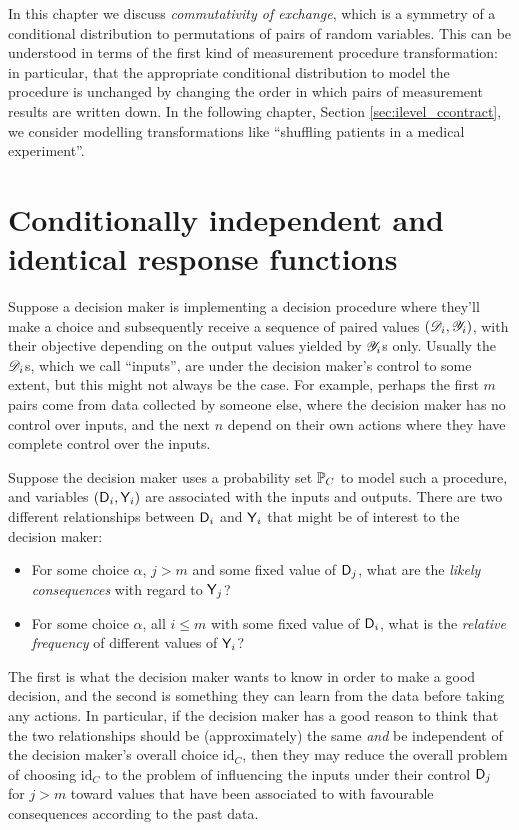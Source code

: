 In this chapter we discuss \emph{commutativity of exchange}, which is a symmetry of a conditional distribution to permutations of pairs of random variables. This can be understood in terms of the first kind of measurement procedure transformation: in particular, that the appropriate conditional distribution to model the procedure is unchanged by changing the order in which pairs of measurement results are written down. In the following chapter, Section \ref{sec:ilevel_ccontract}, we consider modelling transformations like ``shuffling patients in a medical experiment''.

\section[Response functions]{Conditionally independent and identical response functions}\label{sec:response_functions}

Suppose a decision maker is implementing a decision procedure where they'll make a choice and subsequently receive a sequence of paired values $(\mathscr{D}_i,\mathscr{Y}_i)$, with their objective depending on the output values yielded by $\mathscr{Y}_i$s only. Usually the $\mathscr{D}_i$s, which we call ``inputs'', are under the decision maker's control to some extent, but this might not always be the case. For example, perhaps the first $m$ pairs come from data collected by someone else, where the decision maker has no control over inputs, and the next $n$ depend on their own actions where they have complete control over the inputs.

Suppose the decision maker uses a probability set $\mathbb{P}_C$ to model such a procedure, and variables $(\mathsf{D}_i,\mathsf{Y}_i)$ are associated with the inputs and outputs. There are two different relationships between $\mathsf{D}_i$ and $\mathsf{Y}_i$ that might be of interest to the decision maker:
\begin{itemize}
    \item For some choice $\alpha$, $j>m$ and some fixed value of $\mathsf{D}_j$, what are the \emph{likely consequences} with regard to $\mathsf{Y}_j$?
    \item For some choice $\alpha$, all $i\leq m$ with some fixed value of $\mathsf{D}_i$, what is the \emph{relative frequency} of different values of $\mathsf{Y}_i$?
\end{itemize}
The first is what the decision maker wants to know in order to make a good decision, and the second is something they can learn from the data before taking any actions. In particular, if the decision maker has a good reason to think that the two relationships should be (approximately) the same \emph{and} be independent of the decision maker's overall choice $\text{id}_C$, then they may reduce the overall problem of choosing $\text{id}_C$ to the problem of influencing the inputs under their control $\mathsf{D}_j$ for $j>m$ toward values that have been associated to with favourable consequences according to the past data.

